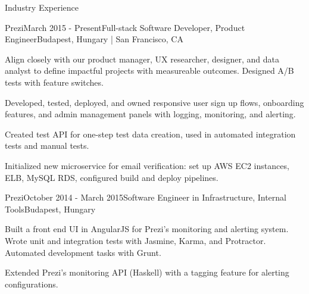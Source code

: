 \documentclass{resume} %
\begin{document}
\begin{rSection}{Industry Experience}

\begin{rSubsection}{Prezi}{March 2015 - Present}{Full-stack Software Developer, Product Engineer}{Budapest, Hungary | San Francisco, CA}
\item Align closely with our product manager, UX researcher, designer, and data analyst to define impactful projects with measureable outcomes. Designed A/B tests with feature switches. 
\item Developed, tested, deployed, and owned responsive user sign up flows, onboarding features, and admin management panels with logging, monitoring, and alerting.


\item Created test API for one-step test data creation, used in automated integration tests and manual tests.
\item Initialized new microservice for email verification: set up AWS EC2 instances, ELB, MySQL RDS, configured build and deploy pipelines. 

\end{rSubsection}


\begin{rSubsection}{Prezi}{October 2014 - March 2015}{Software Engineer in Infrastructure, Internal Tools}{Budapest, Hungary}
\item Built a front end UI in AngularJS for Prezi's monitoring and alerting system. Wrote unit and integration tests with Jasmine, Karma, and Protractor. Automated development tasks with Grunt.
\item Extended Prezi's monitoring API (Haskell) with a tagging feature for alerting configurations.
\end{rSubsection}


\end{rSection}
\end{document}
